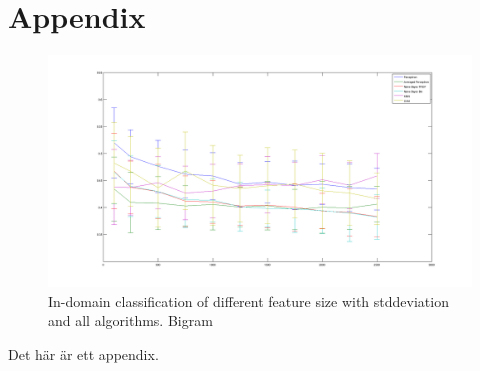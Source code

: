 \chapter{Appendix}
\begin{figure}[H]
\centering
\includegraphics[scale = 0.2]{fig/feature-size100-2500bigram.png}
\caption{In-domain classification of different feature size with stddeviation and all algorithms. Bigram}
\label{fig:trainingsize}
\end{figure} 



Det här är ett appendix.
